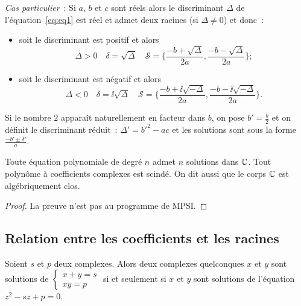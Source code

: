 \emph{Cas particulier}~: Si \(a\), \(b\) et \(c\) sont réels alors le
discriminant \(\Delta\) de l'équation~\eqref{eq:eq1} est réel et admet deux
racines (si \(\Delta \neq 0\)) et donc~:
\begin{itemize}
  \item soit le discriminant est positif et alors
    \begin{equation}
      \Delta >0 \quad \delta = \sqrt{\Delta} \quad \mathcal{S} =
      \biggl\lbrace \frac{-b + \sqrt{\Delta}}{2a} ,
      \frac{-b-\sqrt{\Delta}}{2a} \biggl\rbrace;
    \end{equation}
  \item soit le discriminant est négatif et alors
    \begin{equation}
      \Delta <0 \quad \delta = \ii\sqrt{\Delta} \quad \mathcal{S} =
      \biggl\lbrace \frac{-b + \ii\sqrt{-\Delta}}{2a} ,
      \frac{-b-\ii\sqrt{-\Delta}}{2a} \biggl\rbrace.
    \end{equation}
\end{itemize}

Si le nombre \(2\) apparaît naturellement en facteur dans \(b\), on pose
\(b' = \frac{b}{2}\) et on définit le discriminant réduit~: \(\Delta' =
b'^2-ac\) et les solutions sont sous la forme \(\frac{-b'\pm \delta'}{a}\).

\begin{theo}
  Toute équation polynomiale de degré \(n\) admet \(n\) solutions dans \(\mathbb{C}\).
  Tout polynôme à coefficients complexes est scindé. On dit aussi que le corps
  \(\mathbb{C}\) est algébriquement clos.
\end{theo}

\begin{proof}
  La preuve n'est pas au programme de MPSI\@.
\end{proof}

\subsection{Relation entre les coefficients et les racines}\label{subsec:relationcoefsracines}

\begin{prop}
  Soient \(s\) et \(p\) deux complexes. Alors deux complexes quelconques \(x\)
  et \(y\) sont solutions de \(\begin{cases} x  + y = s \\ xy = p
  \end{cases}\) si et seulement si \(x\) et \(y\) sont solutions de l'équation
  \(z^2 -sz + p = 0\).
\end{prop}


